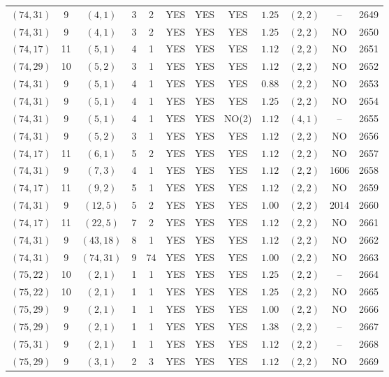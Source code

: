 \begin{longtable}{|c|c|c|c|c|c|c|c|c|c|c|c|}
$(74,31)$ & 9 & $(4,1)$ & 3 & 2 & YES & YES & YES & $1.25$ & $(2,2)$ & -- & 2649\\
$(74,31)$ & 9 & $(4,1)$ & 3 & 2 & YES & YES & YES & $1.25$ & $(2,2)$ & NO & 2650\\
$(74,17)$ & 11 & $(5,1)$ & 4 & 1 & YES & YES & YES & $1.12$ & $(2,2)$ & NO & 2651\\
$(74,29)$ & 10 & $(5,2)$ & 3 & 1 & YES & YES & YES & $1.12$ & $(2,2)$ & NO & 2652\\
$(74,31)$ & 9 & $(5,1)$ & 4 & 1 & YES & YES & YES & $0.88$ & $(2,2)$ & NO & 2653\\
$(74,31)$ & 9 & $(5,1)$ & 4 & 1 & YES & YES & YES & $1.25$ & $(2,2)$ & NO & 2654\\
$(74,31)$ & 9 & $(5,1)$ & 4 & 1 & YES & YES & NO(2) & $1.12$ & $(4,1)$ & -- & 2655\\
$(74,31)$ & 9 & $(5,2)$ & 3 & 1 & YES & YES & YES & $1.12$ & $(2,2)$ & NO & 2656\\
$(74,17)$ & 11 & $(6,1)$ & 5 & 2 & YES & YES & YES & $1.12$ & $(2,2)$ & NO & 2657\\
$(74,31)$ & 9 & $(7,3)$ & 4 & 1 & YES & YES & YES & $1.12$ & $(2,2)$ & 1606 & 2658\\
$(74,17)$ & 11 & $(9,2)$ & 5 & 1 & YES & YES & YES & $1.12$ & $(2,2)$ & NO & 2659\\
$(74,31)$ & 9 & $(12,5)$ & 5 & 2 & YES & YES & YES & $1.00$ & $(2,2)$ & 2014 & 2660\\
$(74,17)$ & 11 & $(22,5)$ & 7 & 2 & YES & YES & YES & $1.12$ & $(2,2)$ & NO & 2661\\
$(74,31)$ & 9 & $(43,18)$ & 8 & 1 & YES & YES & YES & $1.12$ & $(2,2)$ & NO & 2662\\
$(74,31)$ & 9 & $(74,31)$ & 9 & 74 & YES & YES & YES & $1.00$ & $(2,2)$ & NO & 2663\\
$(75,22)$ & 10 & $(2,1)$ & 1 & 1 & YES & YES & YES & $1.25$ & $(2,2)$ & -- & 2664\\
$(75,22)$ & 10 & $(2,1)$ & 1 & 1 & YES & YES & YES & $1.25$ & $(2,2)$ & NO & 2665\\
$(75,29)$ & 9 & $(2,1)$ & 1 & 1 & YES & YES & YES & $1.00$ & $(2,2)$ & NO & 2666\\
$(75,29)$ & 9 & $(2,1)$ & 1 & 1 & YES & YES & YES & $1.38$ & $(2,2)$ & -- & 2667\\
$(75,31)$ & 9 & $(2,1)$ & 1 & 1 & YES & YES & YES & $1.12$ & $(2,2)$ & -- & 2668\\
$(75,29)$ & 9 & $(3,1)$ & 2 & 3 & YES & YES & YES & $1.12$ & $(2,2)$ & NO & 2669\\

\end{longtable}
